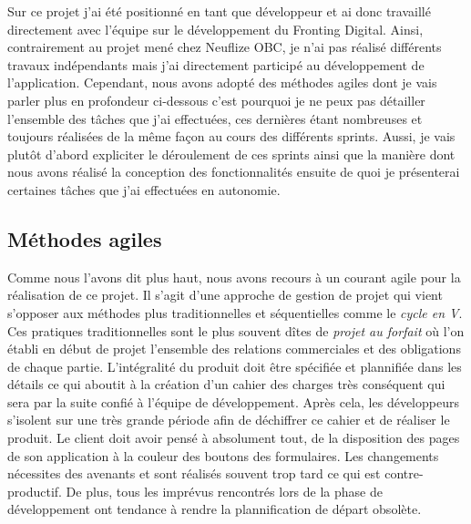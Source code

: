 	Sur ce projet j'ai été positionné en tant que développeur et ai donc travaillé directement avec l'équipe sur le développement du Fronting Digital. Ainsi, contrairement au projet mené chez Neuflize OBC, je n'ai pas réalisé différents travaux indépendants mais j'ai directement participé au développement de l'application. Cependant, nous avons adopté des méthodes agiles \cite{bib_agile} dont je vais parler plus en profondeur ci-dessous c'est pourquoi je ne peux pas détailler l'ensemble des tâches que j'ai effectuées, ces dernières étant nombreuses et toujours réalisées de la même façon au cours des différents sprints. Aussi, je vais plutôt d'abord expliciter le déroulement de ces sprints ainsi que la manière dont nous avons réalisé la conception des fonctionnalités ensuite de quoi je présenterai certaines tâches que j'ai effectuées en autonomie.

\subsection{Méthodes agiles}
	Comme nous l'avons dit plus haut, nous avons recours à un courant agile \cite{bib_agile2} pour la réalisation de ce projet. Il s'agit d'une approche de gestion de projet qui vient s'opposer aux méthodes plus traditionnelles et séquentielles comme le \textit{cycle en V}. Ces pratiques traditionnelles sont le plus souvent dîtes de \textit{projet au forfait} où l'on établi en début de projet l'ensemble des relations commerciales et des obligations de chaque partie. L'intégralité du produit doit être spécifiée et plannifiée dans les détails ce qui aboutit à la création d'un cahier des charges très conséquent qui sera par la suite confié à l'équipe de développement. Après cela, les développeurs s'isolent sur une très grande période afin de déchiffrer ce cahier et de réaliser le produit. Le client doit avoir pensé à absolument tout, de la disposition des pages de son application à la couleur des boutons des formulaires. Les changements nécessites des avenants et sont réalisés souvent trop tard ce qui est contre-productif. De plus, tous les imprévus rencontrés lors de la phase de développement ont tendance à rendre la plannification de départ obsolète. \\
	

